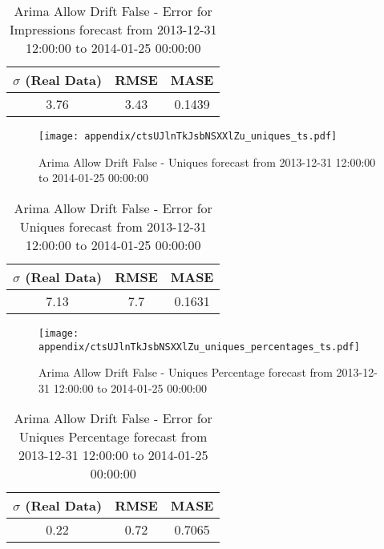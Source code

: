 \begin{table}[H]
\centering
\footnotesize
\begin{tabular}{ccc}
$\sigma$ (Real Data) & RMSE & MASE   \\ \hline
3.76 & 3.43 & 0.1439 \\
\end{tabular}

\vspace{0.5cm}

\caption{
Arima Allow Drift False - Error for Impressions forecast from 2013-12-31 12:00:00 to 2014-01-25 00:00:00}
\end{table}

\begin{figure}[H] \begin{center} \leavevmode
\texttt{[image: appendix/ctsUJlnTkJsbNSXXlZu\_uniques\_ts.pdf]} \caption{
Arima Allow Drift False - Uniques forecast from 2013-12-31 12:00:00 to 2014-01-25 00:00:00} \label{fig:appendix/ctsUJlnTkJsbNSXXlZu_uniques_ts.pdf} \end{center}
\end{figure}

\begin{table}[H]
\centering
\footnotesize
\begin{tabular}{ccc}
$\sigma$ (Real Data) & RMSE & MASE   \\ \hline
7.13 & 7.7 & 0.1631 \\
\end{tabular}

\vspace{0.5cm}

\caption{
Arima Allow Drift False - Error for Uniques forecast from 2013-12-31 12:00:00 to 2014-01-25 00:00:00}
\end{table}

\begin{figure}[H] \begin{center} \leavevmode
\texttt{[image: appendix/ctsUJlnTkJsbNSXXlZu\_uniques\_percentages\_ts.pdf]} \caption{
Arima Allow Drift False - Uniques Percentage forecast from 2013-12-31 12:00:00 to 2014-01-25 00:00:00} \label{fig:appendix/ctsUJlnTkJsbNSXXlZu_uniques_percentages_ts.pdf} \end{center}
\end{figure}

\begin{table}[H]
\centering
\footnotesize
\begin{tabular}{ccc}
$\sigma$ (Real Data) & RMSE & MASE   \\ \hline
0.22 & 0.72 & 0.7065 \\
\end{tabular}

\vspace{0.5cm}

\caption{
Arima Allow Drift False - Error for Uniques Percentage forecast from 2013-12-31 12:00:00 to 2014-01-25 00:00:00}
\end{table}

